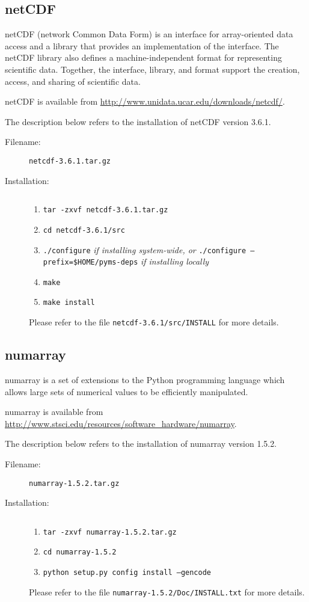 \subsection{netCDF}

netCDF (network Common Data Form) is an interface for array-oriented
data access and a library that provides an implementation of the
interface. The netCDF library also defines a machine-independent
format for representing scientific data. Together, the interface,
library, and format support the creation, access, and sharing of
scientific data.

netCDF is available from \url{http://www.unidata.ucar.edu/downloads/netcdf/}.

The description below refers to the installation of netCDF version
3.6.1.

\begin{description}
\item [Filename:] {\tt netcdf-3.6.1.tar.gz}
\item [Installation:] $ $
  \begin{enumerate}
  \item {\tt tar -zxvf netcdf-3.6.1.tar.gz}
  \item {\tt cd netcdf-3.6.1/src}
  \item {\tt ./configure} {\it if installing system-wide, or}\newline
        {\tt ./configure --prefix=\$HOME/pyms-deps} {\it if installing locally}
  \item {\tt make}
  \item {\tt make install}
  \end{enumerate}
Please refer to the file {\tt netcdf-3.6.1/src/INSTALL} for more details.
\end{description}

\subsection{numarray}

numarray is a set of extensions to the Python programming language which
allows large sets of numerical values to be efficiently manipulated.

numarray is available from \url{http://www.stsci.edu/resources/software_hardware/numarray}.

The description below refers to the installation of numarray version
1.5.2.

\begin{description}
\item [Filename:] {\tt numarray-1.5.2.tar.gz}
\item [Installation:] $ $
  \begin{enumerate}
  \item {\tt tar -zxvf numarray-1.5.2.tar.gz}
  \item {\tt cd numarray-1.5.2}
  \item {\tt python setup.py config install --gencode}
  \end{enumerate}
Please refer to the file {\tt numarray-1.5.2/Doc/INSTALL.txt} for more
details.
\end{description}

